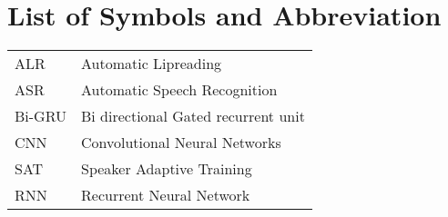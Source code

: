 				\chapter*{List of Symbols and Abbreviation}
			\endgroup
		\normalsize
		\begin{tabular}{p{1in}p{3in}}
			ALR & Automatic Lipreading\\
			ASR & Automatic Speech Recognition\\
			Bi-GRU & Bi directional Gated recurrent unit\\
			CNN & Convolutional Neural Networks\\
			SAT & Speaker Adaptive Training\\
			RNN & Recurrent Neural Network \\
		 
		\end{tabular}
		\pagebreak
